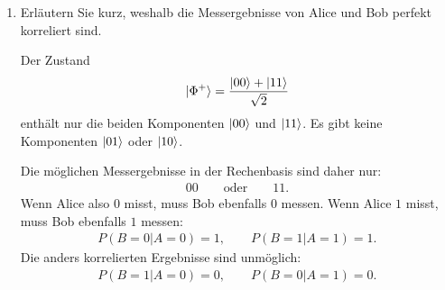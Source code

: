 \documentclass[11pt,a4paper]{scrartcl}
\begin{document}
\begin{enumerate}[label=(\alph*)]
\begin{calculationbox}
            \begin{solutionbox}[title=Zustand von Bob nach Alices Messung]
                Für den Zustand
                \begin{align*}
                    \ket{\Phi^+}
                    =
                    \frac{\ket{00}+\ket{11}}{\sqrt2}
                \end{align*}
                gilt:
                \begin{align*}
                    \text{Alice misst }0
                    &\quad\Longrightarrow\quad
                    \text{Bob hat }\ket{0},
                    \\
                    \text{Alice misst }1
                    &\quad\Longrightarrow\quad
                    \text{Bob hat }\ket{1}.
                \end{align*}
            \end{solutionbox}
        \end{calculationbox}

        \item Erläutern Sie kurz, weshalb die Messergebnisse von Alice und Bob perfekt korreliert sind.

        \begin{calculationbox}
            Der Zustand
            \begin{align*}
                \ket{\Phi^+}
                =
                \frac{\ket{00}+\ket{11}}{\sqrt2}
            \end{align*}
            enthält nur die beiden Komponenten $\ket{00}$ und $\ket{11}$. Es gibt keine Komponenten $\ket{01}$ oder $\ket{10}$.

            \begin{calculationbox}[title=Korrelation]
                Die möglichen Messergebnisse in der Rechenbasis sind daher nur:
                \begin{align*}
                    00
                    \qquad
                    \text{oder}
                    \qquad
                    11.
                \end{align*}
                Wenn Alice also $0$ misst, muss Bob ebenfalls $0$ messen. Wenn Alice $1$ misst, muss Bob ebenfalls $1$ messen:
                \begin{align*}
                    P(B=0|A=0)=1,
                    \qquad
                    P(B=1|A=1)=1.
                \end{align*}
                Die anders korrelierten Ergebnisse sind unmöglich:
                \begin{align*}
                    P(B=1|A=0)=0,
                    \qquad
                    P(B=0|A=1)=0.
                \end{align*}
            \end{calculationbox}


\end{calculationbox}
\end{enumerate}
\end{document}
